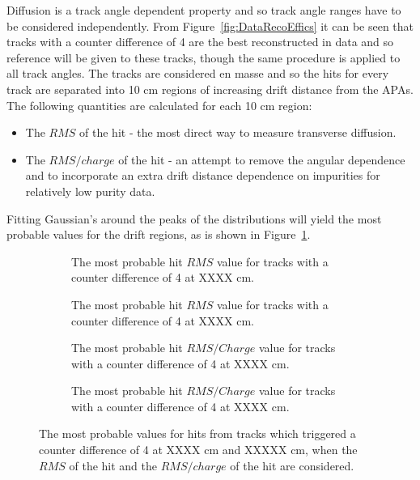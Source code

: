 Diffusion is a track angle dependent property and so track angle ranges have to be considered independently. From Figure~\ref{fig:DataRecoEffics} it can be seen that tracks with a counter difference of 4 are the best reconstructed in data and so reference will be given to these tracks, though the same procedure is applied to all track angles. The tracks are considered en masse and so the hits for every track are separated into 10 cm regions of increasing drift distance from the APAs. The following quantities are calculated for each 10 cm region:
\begin{itemize}
\item The $RMS$ of the hit - the most direct way to measure transverse diffusion.
\item The $RMS/charge$ of the hit - an attempt to remove the angular dependence and to incorporate an extra drift distance dependence on impurities for relatively low purity data.
\end{itemize}
Fitting Gaussian's around the peaks of the distributions will yield the most probable values for the drift regions, as is shown in Figure~\ref{fig:DiffDataHitFit}. \\

\begin{figure}[h!]
  \centering
  \begin{subfigure}{0.45\textwidth}
    \centering
    \caption{The most probable hit $RMS$ value for tracks with a counter difference of 4 at XXXX cm.}
  \end{subfigure}
  \hspace{0.08\textwidth}
  \begin{subfigure}{0.45\textwidth}
    \centering
    \caption{The most probable hit $RMS$ value for tracks with a counter difference of 4 at XXXX cm.}
  \end{subfigure}
  \begin{subfigure}{0.45\textwidth}
    \centering
    \caption{The most probable hit $RMS/Charge$ value for tracks with a counter difference of 4 at XXXX cm.}
  \end{subfigure}
  \hspace{0.08\textwidth}
  \begin{subfigure}{0.45\textwidth}
    \centering
    \caption{The most probable hit $RMS/Charge$ value for tracks with a counter difference of 4 at XXXX cm.}
  \end{subfigure}
  \caption[The most probable values of the $RMS$ and $RMS/Charge$ distributions for tracks with a counter difference of 4 in the 35 ton data]
          {The most probable values for hits from tracks which triggered a counter difference of 4 at XXXX cm and XXXXX cm, when the $RMS$ of the hit and the $RMS/charge$ of the hit are considered.}
          \label{fig:DiffDataHitFit}
\end{figure}

